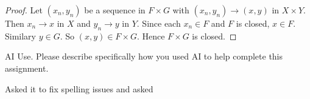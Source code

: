 \documentclass[minion]{homework}
\begin{document}
\begin{problems}
\begin{proof}
  Let $(x_n,y_n)$ be a sequence in $F \times G$ with $(x_n, y_n) \to (x,y)$ in $X \times Y$. Then $x_n \to x$ in $X$ and $y_n \to y$ in $Y$. Since each $x_n \in F$ and $F$ is closed, $x \in F$. Similary $y \in G$. So $(x,y) \in F \times G$. Hence $F \times G$ is closed.
\end{proof}

\problem AI Use. Please describe specifically how you used AI to help complete this assignment. \newline

Asked it to fix spelling issues and asked
\end{problems}
\end{document}
